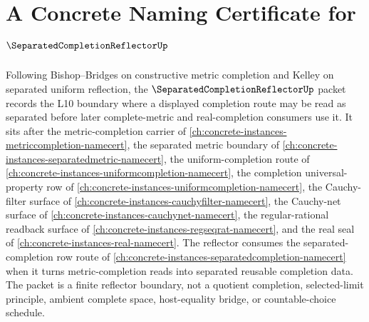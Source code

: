 \chapter{A Concrete Naming Certificate for $\SeparatedCompletionReflectorUp$}
\label{ch:concrete-instances-separated-completion-reflector-namecert}

Following Bishop--Bridges on constructive metric completion and Kelley on separated uniform reflection, the $\SeparatedCompletionReflectorUp$ packet records the L10 boundary where a displayed completion route may be read as separated before later complete-metric and real-completion consumers use it. It sits after the metric-completion carrier of \autoref{ch:concrete-instances-metriccompletion-namecert}, the separated metric boundary of \autoref{ch:concrete-instances-separatedmetric-namecert}, the uniform-completion route of \autoref{ch:concrete-instances-uniformcompletion-namecert}, the completion universal-property row of \autoref{ch:concrete-instances-uniformcompletion-namecert}, the Cauchy-filter surface of \autoref{ch:concrete-instances-cauchyfilter-namecert}, the Cauchy-net surface of \autoref{ch:concrete-instances-cauchynet-namecert}, the regular-rational readback surface of \autoref{ch:concrete-instances-regseqrat-namecert}, and the real seal of \autoref{ch:concrete-instances-real-namecert}. The reflector consumes the separated-completion row route of \autoref{ch:concrete-instances-separatedcompletion-namecert} when it turns metric-completion reads into separated reusable completion data. The packet is a finite reflector boundary, not a quotient completion, selected-limit principle, ambient complete space, host-equality bridge, or countable-choice schedule.

